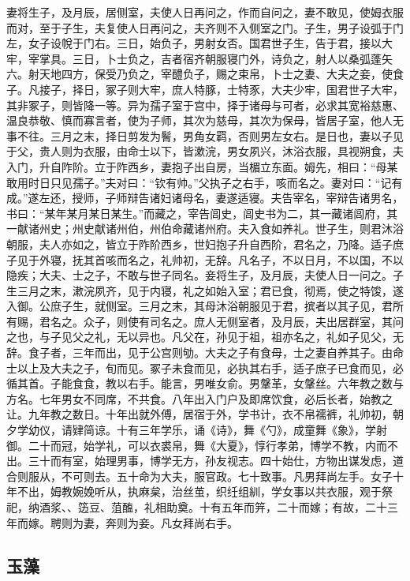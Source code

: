\documentclass[]{article}
\begin{document}
妻将生子，及月辰，居侧室，夫使人日再问之，作而自问之，妻不敢见，使姆衣服而对，至于子生，夫复使人日再问之，夫齐则不入侧室之门。子生，男子设弧于门左，女子设帨于门右。三日，始负子，男射女否。国君世子生，告于君，接以大牢，宰掌具。三日，卜士负之，吉者宿齐朝服寝门外，诗负之，射人以桑弧蓬矢六。射天地四方，保受乃负之，宰醴负子，赐之束帛，卜士之妻、大夫之妾，使食子。凡接子，择日，冢子则大牢，庶人特豚，士特豕，大夫少牢，国君世子大牢，其非冢子，则皆降一等。异为孺子室于宫中，择于诸母与可者，必求其宽裕慈惠、温良恭敬、慎而寡言者，使为子师，其次为慈母，其次为保母，皆居子室，他人无事不往。三月之末，择日剪发为鬌，男角女羁，否则男左女右。是日也，妻以子见于父，贵人则为衣服，由命士以下，皆漱浣，男女夙兴，沐浴衣服，具视朔食，夫入门，升自阼阶。立于阼西乡，妻抱子出自房，当楣立东面。姆先，相曰：``母某敢用时日只见孺子。''夫对曰：``钦有帅。''父执子之右手，咳而名之。妻对曰：``记有成。''遂左还，授师，子师辩告诸妇诸母名，妻遂适寝。夫告宰名，宰辩告诸男名，书曰：``某年某月某日某生。''而藏之，宰告闾史，闾史书为二，其一藏诸闾府，其一献诸州史；州史献诸州伯，州伯命藏诸州府。夫入食如养礼。世子生，则君沐浴朝服，夫人亦如之，皆立于阼阶西乡，世妇抱子升自西阶，君名之，乃降。适子庶子见于外寝，抚其首咳而名之，礼帅初，无辞。凡名子，不以日月，不以国，不以隐疾；大夫、士之子，不敢与世子同名。妾将生子，及月辰，夫使人日一问之。子生三月之末，漱浣夙齐，见于内寝，礼之如始入室；君已食，彻焉，使之特馂，遂入御。公庶子生，就侧室。三月之末，其母沐浴朝服见于君，摈者以其子见，君所有赐，君名之。众子，则使有司名之。庶人无侧室者，及月辰，夫出居群室，其问之也，与子见父之礼，无以异也。凡父在，孙见于祖，祖亦名之，礼如子见父，无辞。食子者，三年而出，见于公宫则劬。大夫之子有食母，士之妻自养其子。由命士以上及大夫之子，旬而见。冢子未食而见，必执其右手，适子庶子已食而见，必循其首。子能食食，教以右手。能言，男唯女俞。男鞶革，女鞶丝。六年教之数与方名。七年男女不同席，不共食。八年出入门户及即席饮食，必后长者，始教之让。九年教之数日。十年出就外傅，居宿于外，学书计，衣不帛襦裤，礼帅初，朝夕学幼仪，请肄简谅。十有三年学乐，诵《诗》，舞《勺》，成童舞《象》，学射御。二十而冠，始学礼，可以衣裘帛，舞《大夏》，惇行孝弟，博学不教，内而不出。三十而有室，始理男事，博学无方，孙友视志。四十始仕，方物出谋发虑，道合则服从，不可则去。五十命为大夫，服官政。七十致事。凡男拜尚左手。女子十年不出，姆教婉娩听从，执麻枲，治丝茧，织纴组紃，学女事以共衣服，观于祭祀，纳酒浆、、笾豆、菹醢，礼相助奠。十有五年而笄，二十而嫁；有故，二十三年而嫁。聘则为妻，奔则为妾。凡女拜尚右手。

\hypertarget{header-n454}{%
\subsection{玉藻}\label{header-n454}}
\end{document}
